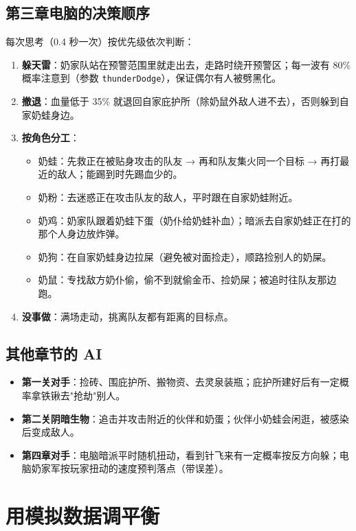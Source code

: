 \documentclass[11pt,a4paper]{ctexart}
\begin{document}
\subsection{第三章电脑的决策顺序}
每次思考（0.4 秒一次）按优先级依次判断：
\begin{enumerate}
  \item \textbf{躲天雷}：奶家队站在预警范围里就走出去，走路时绕开预警区；每一波有 80\% 概率注意到（参数 \texttt{thunderDodge}），保证偶尔有人被劈黑化。
  \item \textbf{撤退}：血量低于 35\% 就退回自家庇护所（除奶鼠外敌人进不去），否则躲到自家奶蛙身边。
  \item \textbf{按角色分工}：
    \begin{itemize}
      \item 奶蛙：先救正在被贴身攻击的队友 → 再和队友集火同一个目标 → 再打最近的敌人；能踢到时先踢血少的。
      \item 奶粉：去迷惑正在攻击队友的敌人，平时跟在自家奶蛙附近。
      \item 奶鸡：奶家队跟着奶蛙下蛋（奶仆给奶蛙补血）；暗派去自家奶蛙正在打的那个人身边放炸弹。
      \item 奶狗：在自家奶蛙身边拉屎（避免被对面捡走），顺路捡别人的奶屎。
      \item 奶鼠：专找敌方奶仆偷，偷不到就偷金币、捡奶屎；被追时往队友那边跑。
    \end{itemize}
  \item \textbf{没事做}：满场走动，挑离队友都有距离的目标点。
\end{enumerate}

\subsection{其他章节的 AI}
\begin{itemize}
  \item \textbf{第一关对手}：捡砖、围庇护所、搬物资、去灵泉装瓶；庇护所建好后有一定概率拿铁锹去"抢劫"别人。
  \item \textbf{第二关阴暗生物}：追击并攻击附近的伙伴和奶蛋；伙伴小奶蛙会闲逛，被感染后变成敌人。
  \item \textbf{第四章对手}：电脑暗派平时随机扭动，看到针飞来有一定概率按反方向躲；电脑奶家军按玩家扭动的速度预判落点（带误差）。
\end{itemize}

\section{用模拟数据调平衡}
\end{document}
